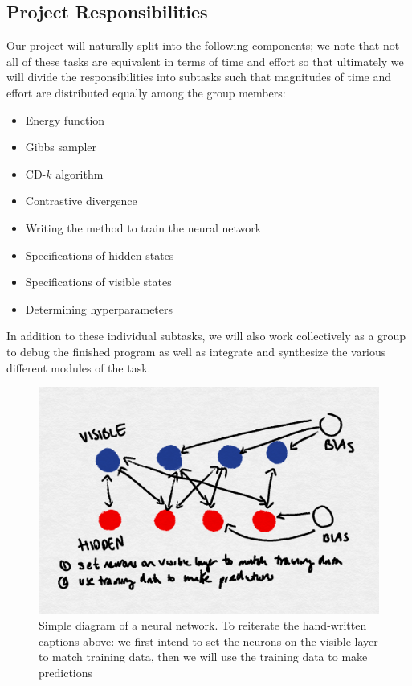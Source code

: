 \documentclass[12pt]{article}
\begin{document}
\subsection{Project Responsibilities}
Our project will naturally split into the following components; we note that not all of these tasks are equivalent in terms of time and effort so that ultimately we will divide the responsibilities into subtasks such that magnitudes of time and effort are distributed equally among the group members:
\begin{itemize}
  \item Energy function
  \item Gibbs sampler
  \item CD-$k$ algorithm
  \item Contrastive divergence
  \item Writing the method to train the neural network
  \item Specifications of hidden states
  \item Specifications of visible states
  \item Determining hyperparameters
\end{itemize}

In addition to these individual subtasks, we will also work collectively as a group to debug the finished program as well as integrate and synthesize the various different modules of the task.

\begin{figure}
  \centerline{\includegraphics[scale=0.3]{layers_rbm.png}}
  \caption{Simple diagram of a neural network. To reiterate the hand-written captions above: we first intend to set the neurons on the visible layer to match training data, then we will use the training data to make predictions}
\end{figure}
\end{document}
